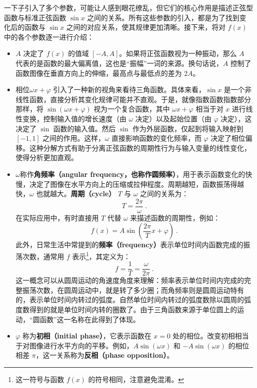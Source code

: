 一下子引入了多个参数，可能让人感到眼花缭乱，但它们的核心作用是描述正弦型函数与标准正弦函数 $\sin x$ 之间的关系。所有这些参数的引入，都是为了找到变化后的函数与 $\sin x$ 之间的对应关系，使其规律更加清晰。接下来，将对 $f(x)$ 中的各个参数逐一进行介绍：
\begin{itemize}
\item $A$ 决定了 $f(x)$ 的值域 $\left[-A, A\right]$。如果将正弦函数视为一种振动，那么 $A$ 代表的是函数的最大偏离值，这也是“振幅”一词的来源。换句话说，$A$ 控制了函数图像在垂直方向上的伸缩，最高点与最低点的差为 $2A$。
\item 相位$\omega x + \varphi$ 引入了一种新的视角来看待三角函数。具体来看，$\sin x$ 是一个非线性函数，直接分析其变化规律可能并不直观。于是，就像指数函数指数部分那样，将 $\sin(\omega x + \varphi)$ 视为一个复合函数，其中 $\omega x + \varphi$ 相当于对 $x$ 进行线性变换，控制输入值的增长速度（由 $\omega$ 决定）以及起始位置（由 $\varphi$ 决定），这决定了 $\sin$ 函数的输入值。然后 $\sin$ 作为外层函数，仅起到将输入映射到 $[-1,1]$ 之间的作用。这样，$\omega$ 直接影响函数的变化频率，而 $\varphi$ 决定了相位偏移。这种分解方式有助于分离正弦函数的周期性行为与输入变量的线性变化，使得分析更加直观。

\item $\omega$称作\textbf{角频率（angular frequency，也称作圆频率）}，用于表示函数变化的快慢，决定了图像在水平方向上的压缩或拉伸程度。周期越短，函数振荡得越快，$\omega$ 也就越大。\textbf{周期（cycle）} $T$ 与 $\omega$ 之间的关系为：
\begin{equation}
T = \frac{2\pi}{\omega}~.
\end{equation}
在实际应用中，有时直接用 $T$ 代替 $\omega$ 来描述函数的周期性，例如：
\begin{equation}
f(x) = A\sin\left(\frac{2\pi}{T} x + \varphi\right)~.
\end{equation}
此外，日常生活中常提到的\textbf{频率（frequency）}表示单位时间内函数完成的振荡次数，通常用 $f$ 表示\footnote{这一符号与函数 $f(x)$ 的符号相同，注意避免混淆。}，其定义为：
\begin{equation}
f = \frac{1}{T} = \frac{\omega}{2\pi}~.
\end{equation}
这一概念可以从圆周运动的角速度角度来理解：频率表示单位时间内完成的完整振荡次数，在圆周运动中，就是转了多少圈；而角频率则是圆周运动特有的，表示单位时间内转过的弧度。自然单位时间内转过的弧度数除以圆周的弧度数得到的就是单位时间内转的圈数了。由于三角函数来源于单位圆上的运动，“圆函数”这一名称在此得到了体现。



\item $\varphi$ 称为\textbf{初相（initial phase）}，它表示函数在 $x = 0$ 处的相位。改变初相相当于对图像进行水平方向的平移。例如，$A\sin(\omega x)$ 和 $-A\sin(\omega x)$ 的相位相差 $\pi$，这一关系称为\textbf{反相（phase opposition）}。
\end{itemize}

